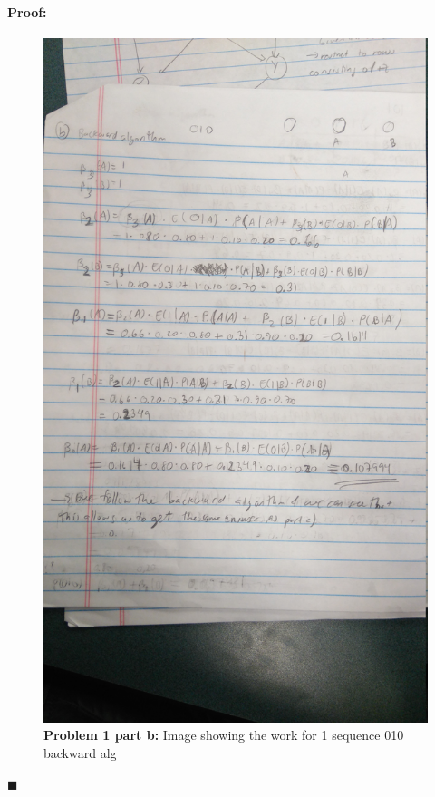 \documentclass[12pt]{article}
\newenvironment{proof}{\paragraph{Proof: }}{\hfill$\blacksquare$}
\begin{document}
\begin{proof}
\begin{figure}[!htbp]
\centering
\includegraphics[width = 13cm]{hw6_1b_1.jpg}
\caption{\textbf{Problem 1 part b:} Image showing the work for 1 sequence 010 backward alg}
\end{figure}


\end{proof}
\end{document}
